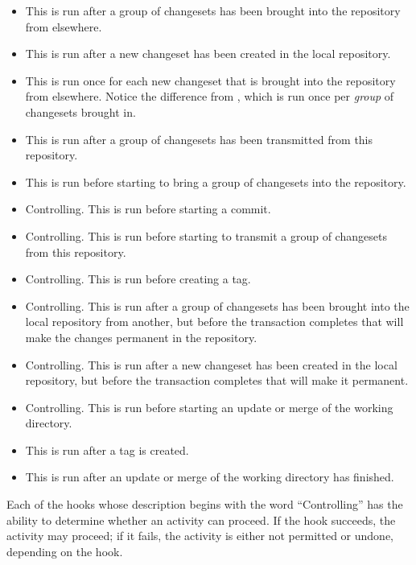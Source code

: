 \begin{itemize}
\item[\small\hook{changegroup}] This is run after a group of
  changesets has been brought into the repository from elsewhere.
\item[\small\hook{commit}] This is run after a new changeset has been
  created in the local repository.
\item[\small\hook{incoming}] This is run once for each new changeset
  that is brought into the repository from elsewhere.  Notice the
  difference from , which is run once per
  \emph{group} of changesets brought in.
\item[\small\hook{outgoing}] This is run after a group of changesets
  has been transmitted from this repository.
\item[\small\hook{prechangegroup}] This is run before starting to
  bring a group of changesets into the repository.
\item[\small\hook{precommit}] Controlling. This is run before starting
  a commit.
\item[\small\hook{preoutgoing}] Controlling. This is run before
  starting to transmit a group of changesets from this repository.
\item[\small\hook{pretag}] Controlling. This is run before creating a tag.
\item[\small\hook{pretxnchangegroup}] Controlling. This is run after a
  group of changesets has been brought into the local repository from
  another, but before the transaction completes that will make the
  changes permanent in the repository.
\item[\small\hook{pretxncommit}] Controlling. This is run after a new
  changeset has been created in the local repository, but before the
  transaction completes that will make it permanent.
\item[\small\hook{preupdate}] Controlling. This is run before starting
  an update or merge of the working directory.
\item[\small\hook{tag}] This is run after a tag is created.
\item[\small\hook{update}] This is run after an update or merge of the
  working directory has finished.
\end{itemize}
Each of the hooks whose description begins with the word
``Controlling'' has the ability to determine whether an activity can
proceed.  If the hook succeeds, the activity may proceed; if it fails,
the activity is either not permitted or undone, depending on the hook.

